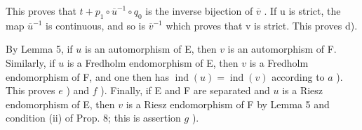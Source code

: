This proves that \(t + p_{1} \circ \overline{u}^{-1} \circ q_{0}\) is the inverse bijection of \(\overline{v}\) . If u is strict, the map \(\overline{u}^{-1}\) is continuous, and so is \(\overline{v}^{-1}\) which proves that v is strict. This proves d).

By Lemma 5, if \(u\) is an automorphism of E, then \(v\) is an automorphism of F. Similarly, if \(u\) is a Fredholm endomorphism of E, then \(v\) is a Fredholm endomorphism of F, and one then has \(\operatorname{ind}(u) = \operatorname{ind}(v)\) according to \(a\) ). This proves \(e\) ) and \(f\) ). Finally, if E and F are separated and \(u\) is a Riesz endomorphism of E, then \(v\) is a Riesz endomorphism of F by Lemma 5 and condition (ii) of Prop. 8; this is assertion \(g\) ).


